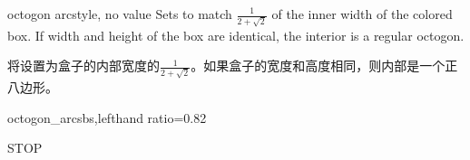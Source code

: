   \begin{docTcbKey}[][doc new=2015-05-05]{octogon arc}{}{style, no value}
  Sets  to match $\frac{1}{2+\sqrt{2}}$ of the inner width
  of the colored box. If width and height of the box are identical,
  the interior is a regular octogon.

将设置为盒子的内部宽度的$\frac{1}{2+\sqrt{2}}$。如果盒子的宽度和高度相同，则内部是一个正八边形。

\begin{exdispExample*}{octogon_arc}{sbs,lefthand ratio=0.82}
\begin{tcolorbox}[enhanced,%
size=minimal,%
auto outer arc,%
width=2.1cm,
octogon arc,%
colback=red,%
colframe=white,%
colupper=white,%
fontupper=\fontsize{7mm}{7mm}\selectfont\bfseries\sffamily,
halign=center,%
valign=center,%
square,%
arc is angular,%
borderline={0.2mm}{-1mm}{red}
]
STOP
\end{tcolorbox}
\end{exdispExample*}
\end{docTcbKey}




  

